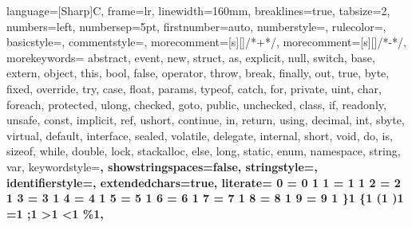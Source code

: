 
\usepackage{etoolbox}



\newcommand\digitstyle{\color{smagenta}}
\newcommand\symbolstyle{\color{base01}}
\makeatletter
\newcommand{\ProcessDigit}[1]
{%
  \ifnum\lst@mode=\lst@Pmode\relax%
   {\digitstyle #1}%
  \else
    #1%
  \fi
}
\makeatother


 {
  language=[Sharp]C,
  frame=lr,
  linewidth=160mm,
  breaklines=true,
  tabsize=2,
  numbers=left,
  numbersep=5pt,
  firstnumber=auto,
  numberstyle=\tiny\ttfamily\color{base0},
  rulecolor=\color{base2},
  basicstyle=\footnotesize\ttfamily,
  commentstyle=\color{base01},
  morecomment=[s][\color{base01}]{/*+}{*/},
  morecomment=[s][\color{base01}]{/*-}{*/},
  morekeywords={  abstract, event, new, struct,
                as, explicit, null, switch,
                base, extern, object, this,
                bool, false, operator, throw,
                break, finally, out, true,
                byte, fixed, override, try,
                case, float, params, typeof,
                catch, for, private, uint,
                char, foreach, protected, ulong,
                checked, goto, public, unchecked,
                class, if, readonly, unsafe,
                const, implicit, ref, ushort,
                continue, in, return, using,
                decimal, int, sbyte, virtual,
                default, interface, sealed, volatile,
                delegate, internal, short, void,
                do, is, sizeof, while,
                double, lock, stackalloc,
                else, long, static,
                enum, namespace, string, var},
  keywordstyle=\bfseries\color{sgreen},
  showstringspaces=false,
  stringstyle=\color{scyan},
  identifierstyle=\color{sblue},
  extendedchars=true,
  literate=
    {0}{{{\ProcessDigit{0}}}}1
    {1}{{{\ProcessDigit{1}}}}1
    {2}{{{\ProcessDigit{2}}}}1
    {3}{{{\ProcessDigit{3}}}}1
    {4}{{{\ProcessDigit{4}}}}1
    {5}{{{\ProcessDigit{5}}}}1
    {6}{{{\ProcessDigit{6}}}}1
    {7}{{{\ProcessDigit{7}}}}1
    {8}{{{\ProcessDigit{8}}}}1
    {9}{{{\ProcessDigit{9}}}}1
    {\}}{{\symbolstyle{\}}}}1
    {\{}{{\symbolstyle{\{}}}1
    {(}{{\symbolstyle{(}}}1
    {)}{{\symbolstyle{)}}}1
    {=}{{\symbolstyle{$=$}}}1
    {;}{{\symbolstyle{$;$}}}1
    {>}{{\symbolstyle{$>$}}}1
    {<}{{\symbolstyle{$<$}}}1
    {\%}{{\symbolstyle{$\%$}}}1,
}

\lstset{escapechar=@,style=solarizedcsharp}